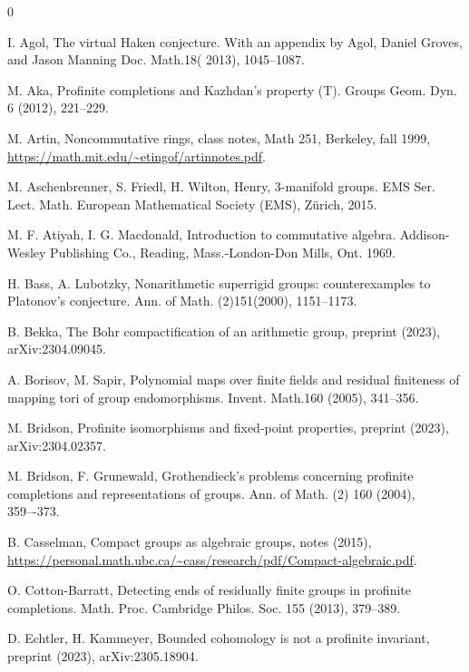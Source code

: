 \documentclass{amsart}
\theoremstyle{definition}
\theoremstyle{remark}
\begin{document}
\begin{thebibliography}{0}

 I. Agol,  
The virtual Haken conjecture. 
With an appendix by Agol, Daniel Groves, and Jason Manning
Doc. Math.18( 2013), 1045--1087.

 M. Aka,  Profinite completions and Kazhdan's property (T). Groups Geom. Dyn. 6 (2012),  221--229.

 M. Artin, Noncommutative rings,  
class notes, Math 251, Berkeley, fall 1999, \url{https://math.mit.edu/~etingof/artinnotes.pdf}.

 M. Aschenbrenner, S. Friedl, H.  Wilton, Henry,  
3-manifold groups.
EMS Ser. Lect. Math.
European Mathematical Society (EMS), Zürich, 2015.

  M. F. Atiyah, I. G. Macdonald, Introduction to commutative algebra. Addison-Wesley Publishing Co., Reading, Mass.-London-Don Mills, Ont. 1969.





H. Bass,  A. Lubotzky,  Nonarithmetic superrigid groups: counterexamples to Platonov's conjecture. Ann. of Math. (2)151(2000),  1151--1173.

 B. Bekka, The Bohr compactification of an arithmetic group, preprint (2023), arXiv:2304.09045.

 A. Borisov, M. Sapir, 
Polynomial maps over finite fields and residual finiteness of mapping tori of group endomorphisms. Invent. Math.160 (2005),  341--356.

 M. Bridson, Profinite isomorphisms and fixed-point properties, preprint (2023),  arXiv:2304.02357.


 M. Bridson,  F. Grunewald,  Grothendieck's problems concerning profinite completions and representations of groups.
Ann. of Math. (2) 160 (2004),  359–-373.

  B. Casselman, Compact groups as algebraic groups, notes (2015),
  \url{https://personal.math.ubc.ca/~cass/research/pdf/Compact-algebraic.pdf}.
  
 O. Cotton-Barratt,  
Detecting ends of residually finite groups in profinite completions. Math. Proc. Cambridge Philos. Soc. 155 (2013),  379--389.


 D.  Echtler, H.  Kammeyer,  Bounded cohomology is not a profinite invariant, preprint (2023), arXiv:2305.18904.




\end{thebibliography}
\end{document}
